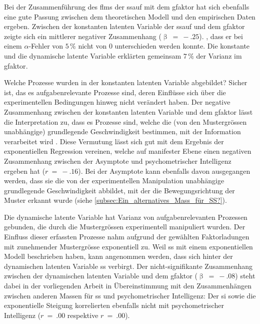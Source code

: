 \documentclass[11pt, twoside, a4paper]{book}		%
\begin{document}
Bei der Zusammenführung des \gls{flm}s der \gls{ssauf} mit dem \gls{gfaktor} hat sich ebenfalls eine gute Passung zwischen dem theoretischen Modell und den empirischen Daten ergeben. Zwischen der konstanten latenten Variable der \gls{ssauf} und dem \gls{gfaktor} zeigte sich ein mittlerer negativer Zusammenhang ($\upbeta~=~-.25$). , dass er bei einem $\alpha$-Fehler von $5\,\%$ nicht von $0$ unterschieden werden konnte. Die konstante und die dynamische latente Variable erklärten gemeinsam $7\,\%$ der Varianz im \gls{gfaktor}.

Welche Prozesse wurden in der konstanten latenten Variable abgebildet? Sicher ist, das es aufgabenrelevante Prozesse sind, deren Einflüsse sich über die experimentellen Bedingungen hinweg nicht verändert haben. Der negative Zusammenhang zwischen der konstanten latenten Variable und dem \gls{gfaktor} lässt die Interpretation zu, dass es Prozesse sind, welche die (von den Mustergrössen unabhängige) grundlegende Geschwindigkeit bestimmen, mit der Information verarbeitet wird \citep[für ähnliche Annahmen über die Inhalte der konstanten latenten Variable siehe][]{Schweizer2007, Stauffer2014}.
Diese Vermutung lässt sich gut mit dem Ergebnis der exponentiellen Regression vereinen, welche auf manifester Ebene einen negativen Zusammenhang zwischen der Asymptote und psychometrischer Intelligenz ergeben hat ($r~=~-.16$). 
Bei der Asymptote kann ebenfalls davon ausgegangen werden, dass sie die von der experimentellen Manipulation unabhängige grundlegende Geschwindigkeit abbildet, mit der die Bewegungsrichtung der Muster erkannt wurde (siehe \autoref{subsec:Ein_alternatives_Mass_für_SS?}).

Die dynamische latente Variable hat Varianz von aufgabenrelevanten Prozessen gebunden, die durch die Mustergrössen experimentell manipuliert wurden. Der Einfluss dieser erfassten Prozesse nahm aufgrund der gewählten Faktorladungen mit zunehmender Mustergrösse exponentiell zu. Weil \citet{Melnick2013} \gls{ss} mit einem exponentiellen Modell beschrieben haben, kann angenommen werden, dass sich hinter der dynamischen latenten Variable  \gls{ss} verbirgt. Der nicht-signifikante Zusammenhang zwischen der dynamischen latenten Variable und dem \gls{gfaktor} ($\upbeta~=~-.08$) steht dabei in der vorliegenden Arbeit in Übereinstimmung mit den Zusammenhängen zwischen anderen Massen für \gls{ss} und psychometrischer Intelligenz: Der \gls{si} sowie die exponentielle Steigung korrelierten ebenfalls nicht mit psychometrischer Intelligenz ($r~=~.00$ respektive $r~=~.00$).
\end{document}
